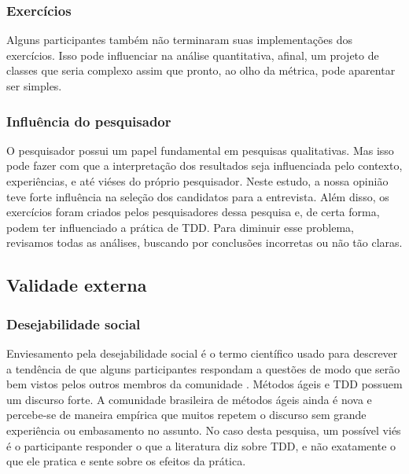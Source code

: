 \documentclass[conference]{IEEEtran}
\begin{document}
\subsubsection{Exercícios}

Alguns participantes também não terminaram suas implementações dos exercícios. Isso
pode influenciar na análise quantitativa, afinal, um projeto de classes que
seria complexo assim que pronto, ao olho da métrica, pode aparentar ser simples.

\subsubsection{Influência do pesquisador}

O pesquisador possui
um papel fundamental em pesquisas qualitativas. Mas isso pode fazer com que
a interpretação dos resultados seja influenciada pelo contexto, experiências,
e até viéses do próprio pesquisador.
Neste estudo, a nossa opinião teve forte influência na seleção dos candidatos
para a entrevista.
Além disso, os exercícios foram criados pelos pesquisadores dessa pesquisa e, 
de certa forma, podem ter influenciado a prática de TDD.
Para diminuir esse problema, revisamos todas as análises,
buscando por conclusões incorretas ou não tão claras. 

\subsection{Validade externa}

\subsubsection{Desejabilidade social}

Enviesamento pela desejabilidade social é o termo científico usado para descrever
a tendência de que alguns participantes respondam a questões de modo que serão
bem vistos pelos outros membros da comunidade \cite{crowne}.
Métodos ágeis e TDD possuem um discurso forte. A comunidade brasileira de métodos
ágeis ainda é nova e percebe-se de maneira empírica que muitos repetem o discurso
sem grande experiência ou embasamento no assunto.
No caso desta pesquisa, um possível viés é o participante responder o que
a literatura diz sobre TDD, e não exatamente o que ele pratica e sente sobre
os efeitos da prática. 
\end{document}
